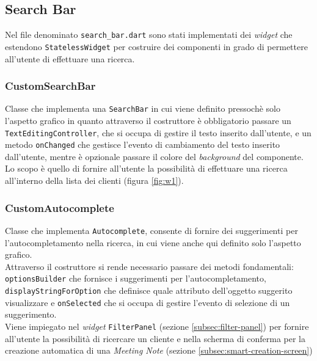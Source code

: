 \subsection{Search Bar}
\label{subsec:search-bar}

Nel file denominato \lstinline{search_bar.dart} sono stati implementati dei \emph{widget} che estendono \lstinline{StatelessWidget} per costruire dei componenti in grado di permettere all'utente di effettuare una ricerca.

\subsubsection*{CustomSearchBar}
\label{subsubsec:custom-search-bar}

Classe che implementa una \lstinline{SearchBar}\cite{site:search-bar} in cui viene definito pressochè solo l'aspetto grafico in quanto attraverso il costruttore è obbligatorio passare un \lstinline{TextEditingController}\cite{site:text-editing-controller}, che si occupa di gestire il testo inserito dall'utente, e un metodo \lstinline{onChanged} che gestisce l'evento di cambiamento del testo inserito dall'utente, mentre è opzionale passare il colore del \emph{background} del componente. \\
Lo scopo è quello di fornire all'utente la possibilità di effettuare una ricerca all'interno della lista dei clienti (figura \ref{fig:w1}).

\subsubsection*{CustomAutocomplete}
\label{subsubsec:custom-autocomplete}

Classe che implementa \lstinline{Autocomplete}\cite{site:autocomplete}, consente di fornire dei suggerimenti per l'autocompletamento nella ricerca, in cui viene anche qui definito solo l'aspetto grafico. \\
Attraverso il costruttore si rende necessario passare dei metodi fondamentali: \lstinline{optionsBuilder} che fornisce i suggerimenti per l'autocompletamento, \lstinline{displayStringForOption} che definisce quale attributo dell'oggetto suggerito visualizzare e \lstinline{onSelected} che si occupa di gestire l'evento di selezione di un suggerimento.\\
Viene impiegato nel \emph{widget} \lstinline{FilterPanel} (sezione \ref{subsec:filter-panel}) per fornire all'utente la possibilità di ricercare un cliente e nella scherma di conferma per la creazione automatica di una \emph{Meeting Note} (sezione \ref{subsec:smart-creation-screen})

